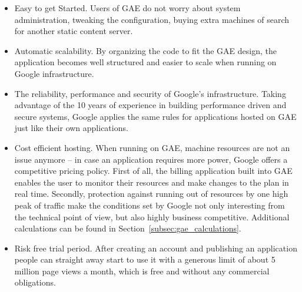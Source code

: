 \begin{itemize}
\item{Easy to get Started. Users of GAE do not worry about system administration, tweaking the configuration, buying extra machines of search for another static content server.}
\item{Automatic scalability. By organizing the code to fit the GAE design, the application becomes well structured and easier to scale when running on Google infrastructure.} 
\item{The reliability, performance and security of Google's infrastructure. Taking advantage of the 10 years of experience in building performance driven and secure systems, Google applies the same rules for applications hosted on GAE just like their own applications.}
\item{Cost efficient hosting. When running on GAE, machine resources are not an issue anymore -- in case an application requires more power, Google offers a competitive pricing policy. First of all, the billing application built into GAE enables the user to monitor their resources and make changes to the plan in real time. Secondly, protection against running out of resources by one high peak of traffic make the conditions set by Google not only interesting from the technical point of view, but also highly business competitive. Additional calculations can be found in Section~\ref{subsec:gae_calculations}.}
\item{Risk free trial period. After creating an account and publishing an application people can straight away start to use it with a generous limit of about 5 million page views a month, which is free and without any commercial obligations.}
\end{itemize}

